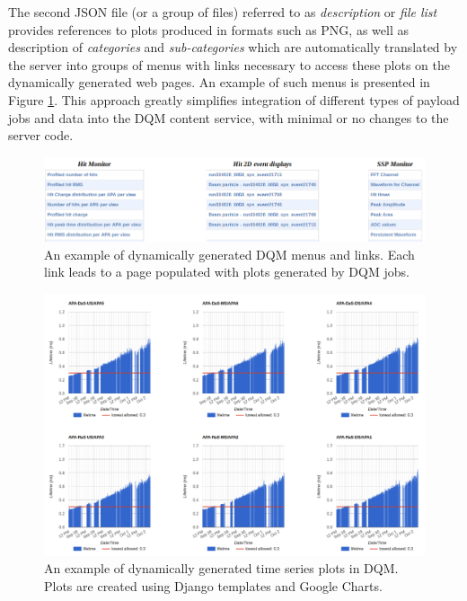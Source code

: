 \documentclass{webofc}
\begin{document}
The second JSON file (or a group of files) referred to as \textit{description} or \textit{file list}
provides references to plots produced in formats such as PNG, as well as description of
\textit{categories} and \textit{sub-categories} which are automatically translated by the server into
groups of menus with links necessary to access these plots on the dynamically generated
web pages. An example of such menus is presented in Figure \ref{fig:tpc_monitor}.
This approach greatly simplifies integration of different types of payload jobs 
and data into the DQM content service, with minimal or no changes to the
server code.

\begin{figure}[tb]
\centering\includegraphics[width=1.0\textwidth]{figures/tpc_monitor_2018_v2.png}
\caption{\label{fig:tpc_monitor}An example of dynamically generated DQM menus and links. Each link leads to
a page populated with plots generated by DQM jobs.}
\end{figure}


\begin{figure}[tb]
\centering\includegraphics[width=1.0\textwidth]{figures/purity_chart_2018_v2.png}
\caption{\label{fig:purity_chart}An example of dynamically generated time series plots in DQM. Plots are created
using Django templates and Google Charts.}
\end{figure}
\end{document}
